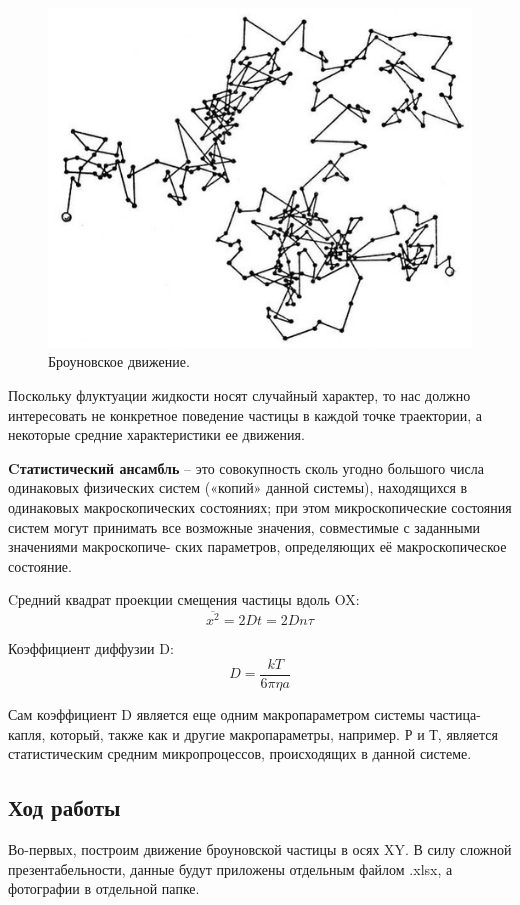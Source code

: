 \documentclass[a4paper,14pt]{article}
\begin{document}
\begin{figure}[h]
    \centering
    \includegraphics[scale=0.6]{brown1.jpg}
    \caption{Броуновское движение.}
\end{figure}

Поскольку флуктуации жидкости носят случайный
характер, то нас должно интересовать не конкретное поведение частицы в каждой точке
траектории, а некоторые средние характеристики ее движения. 

\textbf{Cтатистический ансамбль} – это совокупность сколь угодно большого числа одинаковых
физических систем («копий» данной системы), находящихся в одинаковых
макроскопических состояниях; при этом микроскопические состояния систем могут
принимать все возможные значения, совместимые с заданными значениями макроскопиче-
ских параметров, определяющих её макроскопическое состояние.

Cредний квадрат проекции смещения частицы вдоль OX:
$$
\overline{x^2} = 2Dt = 2Dn\tau
$$

Коэффициент диффузии D:
$$
D = \frac{kT}{6\pi\eta a}
$$

Сам коэффициент D является еще одним макропараметром системы частица-капля, который, также как и другие макропараметры, например. Р и Т, является статистическим средним микропроцессов, происходящих в данной системе.

\clearpage

\subsection{Ход работы}
\hspace{\parindent} Во-первых, построим движение броуновской частицы в осях XY. В силу сложной презентабельности, данные будут приложены отдельным файлом .xlsx, а фотографии в отдельной папке. 
\end{document}
